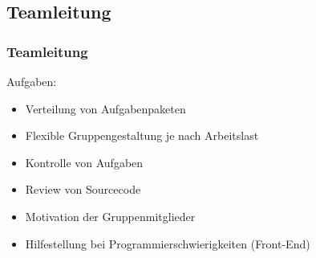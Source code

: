 \subsection{Teamleitung}

\begin{frame} 
  \frametitle{Teamleitung}
  Aufgaben:
    \begin{itemize}
      \item Verteilung von Aufgabenpaketen
      \item Flexible Gruppengestaltung je nach Arbeitslast
      \item Kontrolle von Aufgaben
      \item Review von Sourcecode
      \item Motivation der Gruppenmitglieder
      \item Hilfestellung bei Programmierschwierigkeiten (Front-End)
    \end{itemize}
\end{frame}
